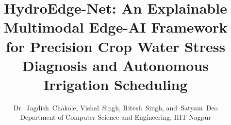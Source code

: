 \documentclass[journal]{IEEEtran}
\begin{document}
\title{HydroEdge-Net: An Explainable Multimodal Edge-AI Framework for Precision Crop Water Stress Diagnosis and Autonomous Irrigation Scheduling}

\author{Dr.~Jagdish~Chakole,
        Vishal~Singh,
        Ritesh~Singh,
        and~Satyam~Deo\\
        \vspace{0.15cm}\normalsize Department of Computer Science and Engineering, IIIT Nagpur
}


\maketitle
















\end{document}
